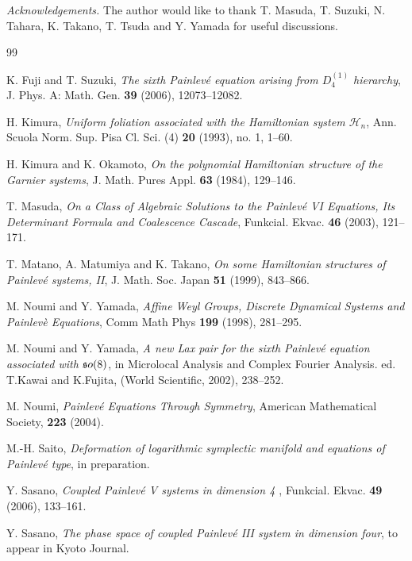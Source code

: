 {\it Acknowledgements.} The author would like to thank T. Masuda, T. Suzuki, N. Tahara, K. Takano, T. Tsuda and Y. Yamada  for useful discussions.



\begin{thebibliography}{99}

 K. Fuji and T. Suzuki, {\em The sixth Painlev\'e equation arising from $D_4^{(1)}$ hierarchy}, J. Phys. A: Math. Gen. {\bf 39} (2006), 12073--12082.

 H. Kimura, {\em Uniform foliation associated with the Hamiltonian system ${\mathcal H}_{n}$}, Ann. Scuola Norm. Sup. Pisa Cl. Sci. (4) {\bf 20} (1993), no. 1, 1--60.


 H. Kimura and K. Okamoto, {\em On the polynomial Hamiltonian structure of the Garnier systems}, J. Math. Pures Appl. {\bf 63} (1984), 129--146.



 T. Masuda, {\em On a Class of Algebraic Solutions to the Painlev\'e VI Equations, Its Determinant Formula and Coalescence Cascade}, Funkcial. Ekvac. {\bf 46} (2003), 121--171.


 T. Matano, A. Matumiya and K. Takano, 
{\em On some Hamiltonian structures of Painlev\'e systems, II}, 
J. Math. Soc. Japan {\bf 51} (1999), 843--866. 


 M. Noumi and Y. Yamada,
        {\em Affine Weyl Groups, Discrete Dynamical Systems and Painlev\`e Equations}, Comm Math Phys {\bf 199} (1998), 281--295.

 M. Noumi and Y. Yamada,
        {\em A new Lax pair for the sixth Painlev\'e equation associated with ${\frak so}(8)$}, in Microlocal Analysis and Complex Fourier Analysis. ed. T.Kawai and K.Fujita, (World Scientific, 2002), 238--252.


 M. Noumi,
        {\em Painlev\'e Equations Through Symmetry}, American Mathematical Society, {\bf 223} (2004).




 M.-H. Saito, {\em Deformation of logarithmic symplectic manifold and equations of Painlev\'e type}, in preparation.


 Y. Sasano, {\em Coupled Painlev\'e V systems in dimension {\rm 4 \rm}}, Funkcial. Ekvac. {\bf 49} (2006), 133--161.

 Y. Sasano, {\em The phase space of coupled Painlev\'e III system in dimension four}, to appear in Kyoto Journal.



\end{thebibliography}

